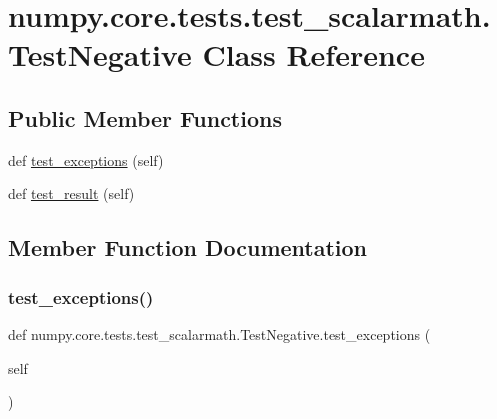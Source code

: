 \hypertarget{classnumpy_1_1core_1_1tests_1_1test__scalarmath_1_1TestNegative}{}\section{numpy.\+core.\+tests.\+test\+\_\+scalarmath.\+Test\+Negative Class Reference}
\label{classnumpy_1_1core_1_1tests_1_1test__scalarmath_1_1TestNegative}
\subsection*{Public Member Functions}
\begin{DoxyCompactItemize}
\item 
def \hyperlink{classnumpy_1_1core_1_1tests_1_1test__scalarmath_1_1TestNegative_a6735c1283dd20a6858030dcd0a4fdd93}{test\+\_\+exceptions} (self)
\item 
def \hyperlink{classnumpy_1_1core_1_1tests_1_1test__scalarmath_1_1TestNegative_acae072290af9336c3db82ba5dbfe51cd}{test\+\_\+result} (self)
\end{DoxyCompactItemize}


\subsection{Member Function Documentation}
\mbox{\label{classnumpy_1_1core_1_1tests_1_1test__scalarmath_1_1TestNegative_a6735c1283dd20a6858030dcd0a4fdd93}} 
\subsubsection{\texorpdfstring{test\+\_\+exceptions()}{test\_exceptions()}}
{\footnotesize\ttfamily def numpy.\+core.\+tests.\+test\+\_\+scalarmath.\+Test\+Negative.\+test\+\_\+exceptions (\begin{DoxyParamCaption}\item[{}]{self }\end{DoxyParamCaption})}

